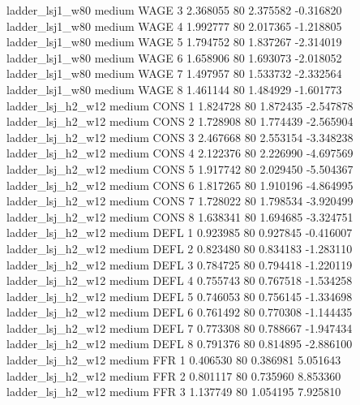     ladder_lsj1_w80     medium     WAGE                 3  2.368055 80       2.375582          -0.316820
    ladder_lsj1_w80     medium     WAGE                 4  1.992777 80       2.017365          -1.218805
    ladder_lsj1_w80     medium     WAGE                 5  1.794752 80       1.837267          -2.314019
    ladder_lsj1_w80     medium     WAGE                 6  1.658906 80       1.693073          -2.018052
    ladder_lsj1_w80     medium     WAGE                 7  1.497957 80       1.533732          -2.332564
    ladder_lsj1_w80     medium     WAGE                 8  1.461144 80       1.484929          -1.601773
  ladder_lsj_h2_w12     medium     CONS                 1  1.824728 80       1.872435          -2.547878
  ladder_lsj_h2_w12     medium     CONS                 2  1.728908 80       1.774439          -2.565904
  ladder_lsj_h2_w12     medium     CONS                 3  2.467668 80       2.553154          -3.348238
  ladder_lsj_h2_w12     medium     CONS                 4  2.122376 80       2.226990          -4.697569
  ladder_lsj_h2_w12     medium     CONS                 5  1.917742 80       2.029450          -5.504367
  ladder_lsj_h2_w12     medium     CONS                 6  1.817265 80       1.910196          -4.864995
  ladder_lsj_h2_w12     medium     CONS                 7  1.728022 80       1.798534          -3.920499
  ladder_lsj_h2_w12     medium     CONS                 8  1.638341 80       1.694685          -3.324751
  ladder_lsj_h2_w12     medium     DEFL                 1  0.923985 80       0.927845          -0.416007
  ladder_lsj_h2_w12     medium     DEFL                 2  0.823480 80       0.834183          -1.283110
  ladder_lsj_h2_w12     medium     DEFL                 3  0.784725 80       0.794418          -1.220119
  ladder_lsj_h2_w12     medium     DEFL                 4  0.755743 80       0.767518          -1.534258
  ladder_lsj_h2_w12     medium     DEFL                 5  0.746053 80       0.756145          -1.334698
  ladder_lsj_h2_w12     medium     DEFL                 6  0.761492 80       0.770308          -1.144435
  ladder_lsj_h2_w12     medium     DEFL                 7  0.773308 80       0.788667          -1.947434
  ladder_lsj_h2_w12     medium     DEFL                 8  0.791376 80       0.814895          -2.886100
  ladder_lsj_h2_w12     medium      FFR                 1  0.406530 80       0.386981           5.051643
  ladder_lsj_h2_w12     medium      FFR                 2  0.801117 80       0.735960           8.853360
  ladder_lsj_h2_w12     medium      FFR                 3  1.137749 80       1.054195           7.925810
